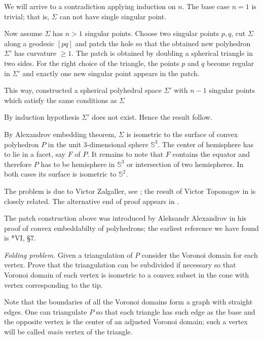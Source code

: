 We will arrive to a contradiction applying induction on $n$.
The base case $n=1$ is trivial; 
that is, $\Sigma$ can not have single singular point.

Now assume $\Sigma$ has $n>1$ singular points.
Choose two singular points $p, q$,
cut $\Sigma$ along a geodesic $[pq]$
and patch the hole so that the obtained new polyhedron $\Sigma'$ has curvature $\ge 1$.
The patch is obtained by doubling a
spherical triangle in two sides.
For the right choice of the triangle,
the points $p$ and $q$ become regular in $\Sigma'$
and exactly one new singular point appears in the patch.

This way, constructed a  spherical polyhedral space $\Sigma'$
with $n-1$ singular points which satisfy the same conditions as $\Sigma$ 

By induction hypothesis $\Sigma'$ does not exist. Hence the result follow.

By Alexandrov embedding theorem, $\Sigma$ is isometric to the surface of convex polyhedron $P$ in the unit 3-dimensional sphere $\mathbb S^3$. 
The center of hemisphere has to lie in a facet, say $F$ of $P$.
It remains to note that $F$ contains the equator and therefore $P$ has to be hemisphere in $\mathbb S^3$ or intersection of two hemispheres.
In both cases its surface is isometric to $\mathbb S^2$.

The problem is due to Victor Zalgaller, 
see \cite{zalgaller-shperical-polygon};
the result of Victor Toponogov in \cite{toponogov} is closely related.
The alternative end of proof appears in \cite{panov-petrunin}.

The patch construction above was introduced by 
Aleksandr Alexandrov
in his proof of convex embeddabilty of polyhedrons;
the earliest reference we have found is
\cite{alexandrov1948}*{VI, \S7}.




\textit{Folding problem.}
Given a triangulation of $P$
consider the Voronoi domain for each vertex.
Prove that the triangulation can be subdivided if necessary
so that Voronoi domain of each vertex is isometric to a convex subset in the cone with vertex corresponding to the tip.

Note that the boundaries of all the Voronoi domains form a graph with straight edges.
One can triangulate $P$ so that each triangle has such edge as the base 
and the opposite vertex is the center of an adjusted Voronoi domain; such a vertex will be called \emph{main} vertex of the triangle.

